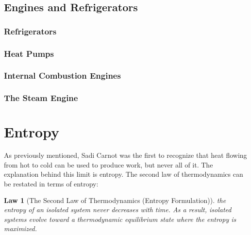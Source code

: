 \documentclass{article}
\newtheorem{law}{Law}
\begin{document}
\subsection{Engines and Refrigerators}
\subsubsection{Refrigerators}
\subsubsection{Heat Pumps}
\subsubsection{Internal Combustion Engines}
\subsubsection{The Steam Engine}

\newpage
\section{Entropy}
As previously mentioned, Sadi Carnot was the first to recognize that heat flowing from hot to cold can be used to produce work, but never all of it. The explanation behind this limit is entropy. The second law of thermodynamics can be restated in terms of entropy:
\begin{law}[The Second Law of Thermodynamics (Entropy Formulation)]
    the entropy of an isolated system never decreases with time. As a result, isolated systems evolve toward a thermodynamic equilibrium state where the entropy is maximized.
\end{law}
\end{document}
